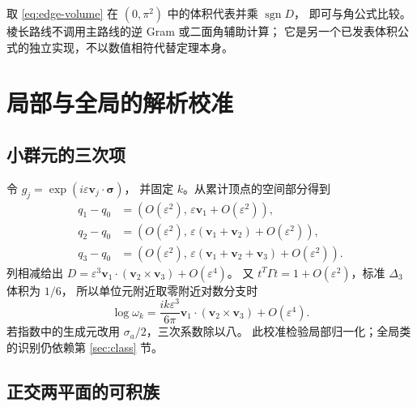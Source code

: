 \documentclass[UTF8,11pt,fontset=none]{ctexart}
\numberwithin{equation}{section}
\theoremstyle{definition}
\DeclareMathOperator{\sgn}{sgn}
\begin{document}
取 \eqref{eq:edge-volume} 在 $(0,\pi^2)$ 中的体积代表并乘 $\sgn D$，
即可与角公式比较。棱长路线不调用主路线的逆 Gram 或二面角辅助计算；
它是另一个已发表体积公式的独立实现，不以数值相符代替定理本身。

\section{局部与全局的解析校准}\label{sec:calibrations}

\subsection{小群元的三次项}

令 $g_j=\exp(i\varepsilon\boldsymbol v_j\cdot\boldsymbol\sigma)$，
并固定 $k$。从累计顶点的空间部分得到
\begin{align*}
 q_1-q_0&=(O(\varepsilon^2),\,\varepsilon\boldsymbol v_1
                      +O(\varepsilon^2)),\\
 q_2-q_0&=(O(\varepsilon^2),\,\varepsilon(\boldsymbol v_1+\boldsymbol v_2)
                      +O(\varepsilon^2)),\\
 q_3-q_0&=(O(\varepsilon^2),\,\varepsilon(\boldsymbol v_1+\boldsymbol v_2
                         +\boldsymbol v_3)+O(\varepsilon^2)).
\end{align*}
列相减给出
$D=\varepsilon^3\boldsymbol v_1\cdot
(\boldsymbol v_2\times\boldsymbol v_3)+O(\varepsilon^4)$。
又 $t^T\Gamma t=1+O(\varepsilon^2)$，标准 $\Delta_3$ 体积为 $1/6$，
所以单位元附近取零附近对数分支时
\begin{equation}
 \boxed{\quad
 \log\omega_k=
 \frac{ik\varepsilon^3}{6\pi}
 \boldsymbol v_1\cdot(\boldsymbol v_2\times\boldsymbol v_3)
 +O(\varepsilon^4).
 \quad}
 \label{eq:small-angle}
\end{equation}
若指数中的生成元改用 $\sigma_a/2$，三次系数除以八。
此校准检验局部归一化；全局类的识别仍依赖第 \ref{sec:class} 节。

\subsection{正交两平面的可积族}
\end{document}
